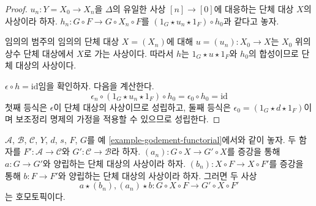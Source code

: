 \begin{proof}
$u_n : Y = X_0 \to X_n$을 $\Delta$의 유일한 사상 $[n] \to [0]$에
대응하는 단체 대상 $X$의 사상이라 하자.
$h_n : G \circ F \to G \circ X_n \circ F$를
$(1_G \star u_n \star 1_F) \circ h_0$과 같다고 놓자.

\medskip\noindent
임의의 범주의 임의의 단체 대상 $X = (X_n)$에 대해
$u =(u_n) : X_0 \to X$는 $X_0$ 위의 상수 단체 대상에서 $X$로 가는
사상이다. 따라서 $h$는 $1_G \star u \star 1_F$와 $h_0$의 합성이므로
단체 대상의 사상이다.

\medskip\noindent
$\epsilon \circ h = \text{id}$임을 확인하자. 다음을 계산한다.
$$
\epsilon_n \circ (1_G \star u_n \star 1_F) \circ h_0 =
\epsilon_0 \circ h_0 = \text{id}
$$
첫째 등식은 $\epsilon$이 단체 대상의 사상이므로 성립하고, 둘째 등식은
$\epsilon_0 = (1_G \star d \star 1_F)$이며 보조정리 명제의 가정을
적용할 수 있으므로 성립한다.
\end{proof}

\begin{lemma}
\label{lemma-godement-two-maps}
$\mathcal{A}$, $\mathcal{B}$, $\mathcal{C}$, $Y$, $d$, $s$, $F$, $G$를
예 \ref{example-godement-functorial}에서와 같이 놓자. 두 함자를
$F' : \mathcal{A} \to \mathcal{C}$와
$G' : \mathcal{C} \to \mathcal{B}$라 하자.
$(a_n) : G \circ X \to G' \circ X$를 증강을 통해
$a : G \to G'$와 양립하는 단체 대상의 사상이라 하자.
$(b_n) : X \circ F \to X \circ F'$를 증강을 통해
$b : F \to F'$와 양립하는 단체 대상의 사상이라 하자. 그러면 두 사상
$$
a \star (b_n), (a_n) \star b : G \circ X \circ F \to G' \circ X \circ F'
$$
는 호모토픽이다.
\end{lemma}

